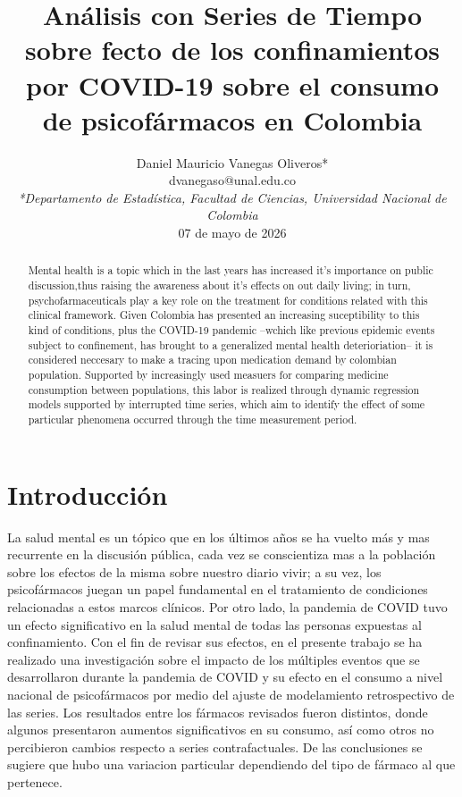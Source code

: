 \documentclass[10pt,twoside,xcolor=table,x11anmes]{IEEEtran}
\title{\vspace{10mm} Análisis con Series de Tiempo sobre fecto de los confinamientos por COVID-19 sobre el consumo de psicofármacos en Colombia}
\author{
	{\fontsize{13}{15.6}\selectfont Daniel Mauricio Vanegas Oliveros*}\\
	\vspace{1mm}\small{dvanegaso@unal.edu.co}\\

	\vspace{5mm}\normalsize\textit{*Departamento de Estadística, Facultad de Ciencias, Universidad Nacional de Colombia}\\
	\vspace{5mm} 07 de mayo de 2026
}
\begin{document}
\maketitle
\thispagestyle{empty}

\vspace{65mm}

\noindent \begin{abstract}

Mental health is a topic which in the last years has increased it's importance on public discussion,thus raising the awareness about it's effects on out daily living; in turn, psychofarmaceuticals play a key role on the treatment for conditions related with this clinical framework. Given Colombia has presented an increasing suceptibility to this kind of conditions, plus the COVID-19 pandemic --wchich like previous epidemic events subject to confinement, has brought to a generalized mental health deterioriation-- it is considered neccesary to make a tracing upon medication demand by colombian population. Supported by increasingly used measuers for comparing medicine consumption between populations, this labor is realized through dynamic regression models supported by interrupted time series, which aim to identify the effect of some particular phenomena occurred through the time measurement period.

\end{abstract}

\section[Introducción]{Introducción}

La salud mental es un tópico que en los últimos años se ha vuelto más y mas recurrente en la discusión pública, cada vez se conscientiza mas a la población sobre los efectos de la misma sobre nuestro diario vivir; a su vez, los psicofármacos juegan un papel fundamental en el tratamiento de condiciones relacionadas a estos marcos clínicos. Por otro lado, la pandemia de COVID tuvo un efecto significativo en la salud mental de todas las personas expuestas al confinamiento. Con el fin de revisar sus efectos, en el presente trabajo se ha realizado una investigación sobre el impacto de los múltiples eventos que se desarrollaron durante la pandemia de COVID y su efecto en el consumo a nivel nacional de psicofármacos por medio del ajuste de modelamiento retrospectivo de las series. Los resultados entre los  fármacos revisados fueron distintos, donde algunos presentaron aumentos significativos en su consumo, así como otros no percibieron cambios respecto a series contrafactuales. De las conclusiones se sugiere que hubo una variacion particular dependiendo del tipo de fármaco al que pertenece.
\end{document}
